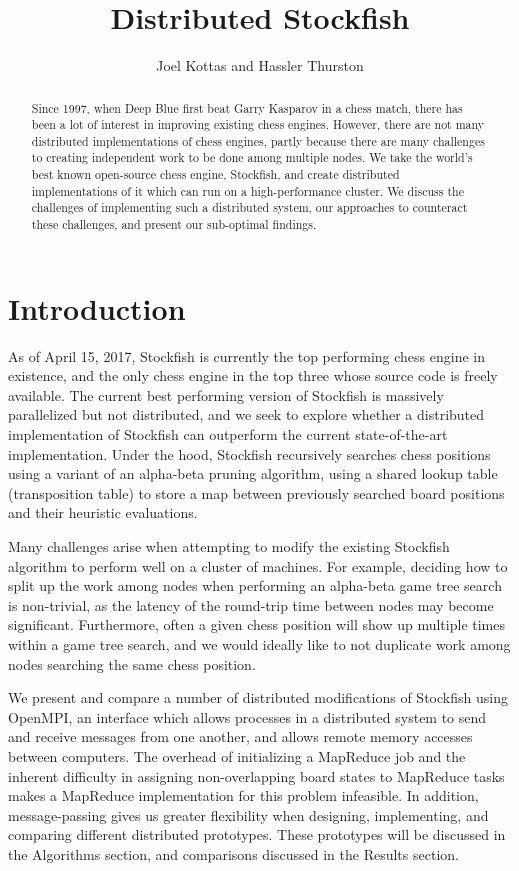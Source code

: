 \documentclass{article}
\title{Distributed Stockfish}
\author{Joel Kottas and Hassler Thurston}
\date{}
\begin{document}
\maketitle

\begin{abstract}
	Since 1997, when Deep Blue first beat Garry Kasparov in a chess match,
	there has been a lot of
	interest in improving existing chess engines. However, there are not
	many distributed implementations of chess engines, partly
	because there are many challenges to creating independent work to be
	done among multiple nodes. We take the world's
	best known open-source chess engine, Stockfish, and create distributed
	implementations of it which can run on a high-performance cluster. We
	discuss the challenges of implementing such a distributed system, our
	approaches to counteract these challenges, and present our sub-optimal findings.
\end{abstract}

\section{Introduction}
As of April 15, 2017, Stockfish\cite{Stockfish} is currently the top performing
chess engine in existence, and the only chess engine in the top three whose
source code is freely available\cite{ChessStandings}. The current best
performing version of Stockfish is massively parallelized but not distributed,
and we seek to explore whether a distributed implementation of Stockfish can
outperform the current state-of-the-art implementation. Under the hood,
Stockfish recursively searches chess positions using a variant of an alpha-beta
pruning algorithm, using a shared lookup table (transposition table) to
store a map between previously searched board positions and their heuristic
evaluations.

Many challenges arise when attempting to modify the
existing Stockfish algorithm to perform well on a cluster of machines.
For example, deciding how to split up the work among nodes when performing an alpha-beta game
tree search is non-trivial, as the latency of the round-trip time between nodes
may become significant. Furthermore, often a given chess position will show up
multiple times within a game tree search, and we would ideally like to not
duplicate work among nodes searching the same chess position.

We present and compare a number of distributed modifications of Stockfish
using OpenMPI\cite{OpenMPI}, an interface which allows processes in a distributed system to
send and receive messages from one another, and allows remote memory accesses
between computers. The overhead of initializing a MapReduce job and the
inherent difficulty in assigning non-overlapping board states to MapReduce tasks
makes a MapReduce implementation for this problem infeasible. In addition,
message-passing gives us greater flexibility when designing, implementing, and
comparing different distributed prototypes. These prototypes will be discussed in
the Algorithms section, and comparisons discussed in the Results section.
\end{document}
